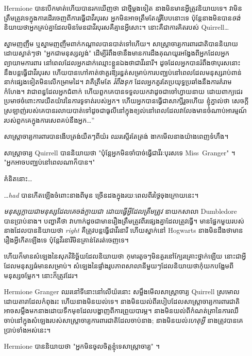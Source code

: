 {{Hermione បាន​បើក​មាត់​ហើយ​បាន​រក​ឃើញ​ថា ជា​ថ្មី​ម្តង​ទៀត នាង​មិន​មាន​អ្វី​ត្រូវ​និយាយ​ទេ។ វាមិនត្រឹមត្រូវទេក្នុងការដើរចេញពីការធ្វើជាវីរបុរស អ្នកមិនអាចត្រឹមតែ\emph{ធ្វើ}បែបនោះទេ ប៉ុន្តែនាងមិនបាន\emph{ចង់}និយាយថាអ្នកគ្រប់គ្នាដែលមិនមែនជាវីរបុរសគឺគ្មានអ្វីសោះ។ នោះគឺជាការគិតរបស់ Quirrell…

ស្នាមញញឹម ឬស្នាមញញឹមពាក់កណ្តាលបានបាត់ទៅហើយ។ សាស្ត្រាចារ្យការពារជាតិបាននិយាយដោយស្ងាត់ៗថា "អ្នកជាមនុស្សល្ងង់" ដើម្បីរំពឹងថានឹងមានការដឹងគុណយូរអង្វែងពីអ្នកដែលអ្នកព្យាយាមការពារ នៅពេលដែលអ្នកដាក់ឈ្មោះខ្លួនឯងថាជាវីរនារី។ ដូចដែលអ្នកបានរំពឹងថាបុរសនោះនឹងបន្តធ្វើជាវីរបុរស ហើយបានហៅគាត់ថាគួរឱ្យរន្ធត់សម្រាប់ការបញ្ឈប់នៅពេលដែលមនុស្សរាប់ពាន់នាក់ផ្សេងទៀតមិនលើកម្រាមដៃ។ វាគឺត្រឹមតែ \emph{រំពឹងទុក} ដែលអ្នកគួរតែប្រយុទ្ធប្រឆាំងនឹងការគំរាមកំហែង។ វាជាពន្ធដែលអ្នកជំពាក់ ហើយពួកគេបានទទួលយកវាដូចជាចៅហ្វាយនាយ ដោយពាក្យជេរប្រមាថចំពោះការយឺតយ៉ាវនៃការទូទាត់របស់អ្នក។ ហើយ​អ្នក​បាន​ធ្វើ​ជា​សាក្សី​រួច​ហើយ ខ្ញុំ​ភ្នាល់​ថា សេចក្តី​ស្រឡាញ់​របស់​គេ​បាន​រលាយ​បាត់​ទៅ​ដូច​ជា​ធូលី​នៅ​ក្នុង​ខ្យល់​នៅ​ពេល​ដែល​វា​លែង​មាន​ចំណាប់​អារម្មណ៍​របស់​ពួក​គេ​ក្នុង​ការ​សេពគប់​នឹង​អ្នក…”

សាស្ត្រាចារ្យ​ការពារ​បាន​ងើប​ត្រង់​យឺតៗ​ពី​យ៉រ ឈរ​ស្ទើរតែ​ត្រង់ ងាក​មើល​នាង​យ៉ាង​ពេញទំហឹង។

សាស្ត្រាចារ្យ Quirrell បាននិយាយថា "ប៉ុន្តែអ្នកមិនចាំបាច់ធ្វើជាវីរៈបុរសទេ Miss~Granger" ។ "អ្នកអាចបញ្ឈប់នៅពេលណាក៏បាន។"

គំនិត​នោះ…

…\emph{had} បានកើតឡើងចំពោះនាងពីមុន ច្រើនដងក្នុងរយៈពេលពីរថ្ងៃចុងក្រោយនេះ។

\emph{មនុស្សក្លាយជាមនុស្សដែលគេចង់ក្លាយជា ដោយធ្វើអ្វីដែលត្រឹមត្រូវ} នាយកសាលា Dumbledore បានប្រាប់នាង។ បញ្ហាគឺថា វាហាក់ដូចជាមានរឿងត្រឹមត្រូវពីរផ្សេងគ្នាដែលត្រូវធ្វើ។ មានផ្នែកមួយរបស់នាងដែលបាននិយាយថា \emph{right} គឺត្រូវបន្តធ្វើជាវីរនារី ហើយស្នាក់នៅ Hogwarts នាងមិនដឹងថាមានរឿងអ្វីកើតឡើងទេ ប៉ុន្តែវីរនារីមិនគ្រាន់តែរត់ចេញទេ។

ហើយ​ក៏មាន​សំឡេង​នៃ​សុភវិនិច្ឆ័យ​ដែល​និយាយ​ថា កុមារ​តូចៗ​មិន​គួរ​នៅ​ក្បែរ​គ្រោះថ្នាក់​ឡើយ នោះ​ជា​អ្វីដែល​មនុស្ស​ធំ​មាន​សម្រាប់​។ សំឡេងនៃផ្ទាំងរូបភាពសាលានីមួយៗដែលនិយាយថាកុំយកបង្អែមពីមនុស្សចម្លែក។ នោះក៏ត្រូវដែរ។

Hermione Granger ឈរនៅទីនោះនៅលើយ៉រនោះ សម្លឹងមើលសាស្រ្តាចារ្យ Quirrell ស្រមោលដោយតារាដែលកំពុងរះ ហើយនាងមិនយល់ទេ។ នាងមិនយល់ពីរបៀបដែលសាស្រ្តាចារ្យការពារជាតិអាចសម្លឹងមកនាងដោយទឹកមុខដែលបង្ហាញពីការព្រួយបារម្ភ។ នាងមិនយល់ពីកំណត់ត្រានៃការឈឺចាប់នៅក្នុងសំឡេងរបស់សាស្ត្រាចារ្យការពារជាតិដែលចាប់នាង; នាងមិនយល់\emph{ហេតុអ្វី} នាងត្រូវបានគេប្រាប់ទាំងអស់នេះ។

Hermione បាននិយាយថា "អ្នកមិនចូលចិត្តខ្ញុំទេសាស្រ្តាចារ្យ" ។

}}
